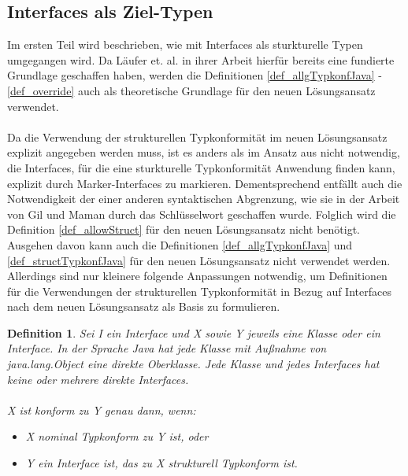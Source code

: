 \documentclass[11pt, 
ngerman,
doublespacing,
chapterinoneline, %
consistentlayout, %
]{scrartcl}
\newtheorem{definition}{Definition}
\begin{document}
\subsection{Interfaces als Ziel-Typen}
Im ersten Teil wird beschrieben, wie mit Interfaces als sturkturelle Typen umgegangen wird. Da Läufer et. al. \cite{structconfjava} in ihrer Arbeit hierfür bereits eine fundierte Grundlage geschaffen haben, werden die Definitionen \ref{def_allgTypkonfJava} - \ref{def_override} auch als theoretische Grundlage für den neuen Lösungsan\-satz verwendet.\\\\
Da die Verwendung der strukturellen Typkonformität im neuen Lösungsan\-satz explizit angegeben werden muss, ist es anders als im Ansatz aus \cite{structconfjava} nicht notwendig, die Interfaces, für die eine sturkturelle Typkonformität Anwendung finden kann, explizit durch Marker-Interfaces zu markieren. Dementsprechend entfällt auch die Notwendigkeit der einer anderen syntaktischen Abgrenzung, wie sie in der Arbeit von Gil und Maman durch das Schlüsselwort geschaffen wurde. Folglich wird die Definition \ref{def_allowStruct} für den neuen Lösungsan\-satz nicht benötigt. Ausgehen davon kann auch die Definitionen \ref{def_allgTypkonfJava} und \ref{def_structTypkonfJava} für den neuen Lösungsansatz nicht verwendet werden. Allerdings sind nur kleinere folgende Anpassung\-en notwendig, um Definitionen für die Verwendungen der strukturellen Typ\-konformität in Bezug auf  Interfaces nach dem neuen Lösungsansatz als Basis zu formulie\-ren.
\begin{definition}\label{def_allgTypkonfJava_V1}
Sei \emph{I} ein Interface und \emph{X} sowie \emph{Y} jeweils eine Klasse oder ein Interface. In der Sprache Java hat jede Klasse mit Außnahme von \emph{java.lang.Object} eine direkte Oberklasse. Jede Klasse und jedes Interfaces hat keine oder mehrere direkte Interfaces.\\\\
\emph{X} ist konform zu \emph{Y} genau dann, wenn:
\begin{itemize}
\item\emph{X} nominal Typkonform zu \emph{Y} ist, oder
\item\emph{Y} ein Interface ist, das zu \emph{X} strukturell Typkonform ist.
\end{itemize}
\end{definition}
\end{document}
